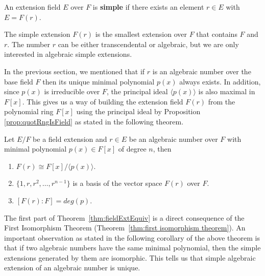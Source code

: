 \documentclass[../main.tex]{subfiles}
\begin{document}
\reversemarginpar
{}
\begin{definition}
An extension field $E$ over $F$ is \textbf{simple} if there exists an element $r \in E$ with $E = F(r)$. 
\end{definition}
The simple extension $F(r)$ is the smallest extension over $F$ that contains $F$ and $r$. The number $r$ can be either transcendental or algebraic, but we are only interested in algebraic simple extensions. 

In the previous section, we mentioned that if $r$ is an algebraic number over the base field $F$ then its unique minimal polynomial $p(x)$ always exists. 
In addition, since $p(x)$ is irreducible over $F$, the principal ideal $\langle p(x)\rangle $ is also maximal in $F[x]$. This gives us a way of building the extension field $F(r)$ from the polynomial ring $F[x]$ using the principal ideal by Proposition \ref{prop:quotRngIsField} as stated in the following theorem.  

\begin{theorem}
\label{thm:fieldExtEquiv}
Let $E/F$ be a field extension and $r \in E$ be an algebraic number over $F$ with minimal polynomial $p(x) \in F[x]$ of degree $n$, then 
\begin{enumerate}
    \item $F(r) \cong F[x] / \langle p(x)\rangle$.
    \item $\{1,r,r^2,\dots,r^{n-1}\}$ is a basis of the vector space $F(r)$ over $F$. 
    \item $[F(r):F] = deg(p)$.
\end{enumerate}
\end{theorem}
The first part of Theorem~\ref{thm:fieldExtEquiv} is a direct consequence of the First Isomorphism Theorem (Theorem~\ref{thm:first isomorphism theorem}).
%
An important observation as stated in the following corollary of the above theorem is that if two algebraic numbers have the same minimal polynomial, then the simple extensions generated by them are isomorphic. This tells us that simple algebraic extension of an algebraic number is unique. 
\end{document}
